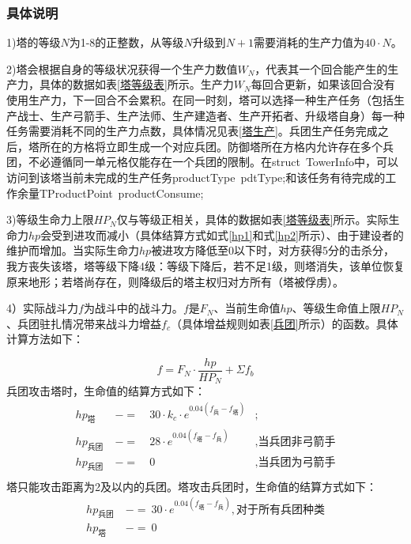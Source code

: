 \documentclass[a4paper,4pt]{article}
\begin{document}
\subsubsection{具体说明}
1)塔的等级$N$为1-8的正整数，从等级$N$升级到$N+1$需要消耗的生产力值为$40 \cdot N$。\par
2)塔会根据自身的等级状况获得一个生产力数值$W_N$，代表其一个回合能产生的生产力，具体的数据如表\ref{塔等级表}所示。生产力$W_N$每回合更新，如果该回合没有使用生产力，下一回合不会累积。在同一时刻，塔可以选择一种生产任务（包括生产战士、生产弓箭手、生产法师、生产建造者、生产开拓者、升级塔自身）每一种任务需要消耗不同的生产力点数，具体情况见表\ref{塔生产}。兵团生产任务完成之后，塔所在的方格将立即生成一个对应兵团。防御塔所在方格内允许存在多个兵团，不必遵循同一单元格仅能存在一个兵团的限制。在struct\ TowerInfo中，可以访问到该塔当前未完成的生产任务productType\ pdtType;和该任务有待完成的工作余量TProductPoint\ productConsume;\par
3)等级生命力上限$HP_N$仅与等级正相关，具体的数据如表\ref{塔等级表}所示。实际生命力$hp$会受到进攻而减小（具体结算方式如式\ref{hp1}和式\ref{hp2}所示）、由于建设者的维护而增加。当实际生命力$hp$被进攻方降低至0以下时，对方获得5分的击杀分，我方丧失该塔，塔等级下降4级：等级下降后，若不足1级，则塔消失，该单位恢复原来地形；若塔尚存在，则降级后的塔主权归对方所有（塔被俘虏）。\par
4）实际战斗力$f$为战斗中的战斗力。$f$是$F_N$、当前生命值$hp$、等级生命值上限$HP_N$、兵团驻扎情况带来战斗力增益$f_c$（具体增益规则如表\ref{兵团}所示）的函数。具体计算方法如下：

\begin{equation}
	f = F_N \cdot \frac{hp}{HP_N} + \Sigma f_b\label{f}
\end{equation}
兵团攻击塔时，生命值的结算方式如下：
\begin{equation}
	\begin{aligned}
		hp_{\text{塔}}   & \ -= & \ 30 \cdot k_c \cdot e^{0.04(f_{\text{兵}}-f_{\text{塔}})} & ;                       \\
		hp_{\text{兵团}} & \ -= & \ 28 \cdot e^{0.04(f_{\text{塔}}-f_{\text{兵}})}           & , \text{当兵团非弓箭手} \\
		hp_{\text{兵团}} & \ -= & \ 0                                                        & , \text{当兵团为弓箭手} \\
	\end{aligned}
	\label{hp1}
\end{equation}
塔只能攻击距离为2及以内的兵团。塔攻击兵团时，生命值的结算方式如下：
\begin{equation}
	\begin{aligned}
		hp_{\text{兵团}} & \ -=\ 30 \cdot e^{0.04(f_{\text{塔}}-f_{\text{兵}})}, \text{对于所有兵团种类} \\
		hp_{\text{塔}}   & \ -=\ 0                                                                       \\
	\end{aligned}
	\label{hp2}
\end{equation}
\end{document}
